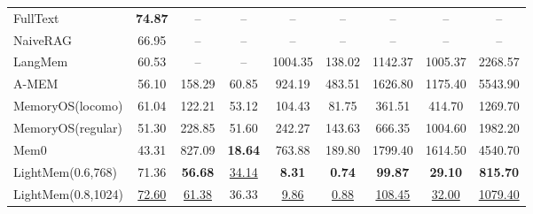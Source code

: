 \begin{table}[t]
{\begin{tabular}{@{}lcccccccc@{}}
\addlinespace[0.4ex]
\midrule

\rowcolor{qwenbar}\multicolumn{9}{c}{\qwenlogo\ \textbf{Qwen3-30B-A3B-Instruct-2507}}\\
\midrule
\rowcolor{qwenlav} FullText          & \textbf{74.87} & -- & -- & -- & -- & -- & -- & -- \\
\rowcolor{qwenlav} NaiveRAG          & 66.95 & -- & -- & -- & -- & -- & -- & -- \\
\rowcolor{qwenlav} LangMem           & 60.53 & -- & -- & 1004.35 & 138.02 & 1142.37 & 1005.37 & 2268.57 \\
\rowcolor{qwenlav} A-MEM             & 56.10 & 158.29 & 60.85 & 924.19 & 483.51 & 1626.80 & 1175.40 & 5543.90 \\
\rowcolor{qwenlav} MemoryOS(locomo)  & 61.04 & 122.21 & 53.12 & 104.43 & 81.75 & 361.51 & 414.70 & 1269.70 \\
\rowcolor{qwenlav} MemoryOS(regular)  & 51.30 & 228.85 & 51.60 & 242.27 & 143.63 & 666.35 & 1004.60 & 1982.20 \\
\rowcolor{qwenlav} Mem0              & 43.31 & 827.09 & \textbf{18.64} & 763.88 & 189.80 & 1799.40 & 1614.50 & 4540.70 \\
\hdashline
\rowcolor{qwenlav} LightMem(0.6,768)  & 71.36 & \textbf{56.68} & \underline{34.14} & \textbf{8.31} & \textbf{0.74} & \textbf{99.87} & \textbf{29.10} & \textbf{815.70} \\
\rowcolor{qwenlav} LightMem(0.8,1024) & \underline{72.60} & \underline{61.38} & 36.33 & \underline{9.86} & \underline{0.88} & \underline{108.45} & \underline{32.00} & \underline{1079.40} \\



\end{tabular}}
\end{table}
